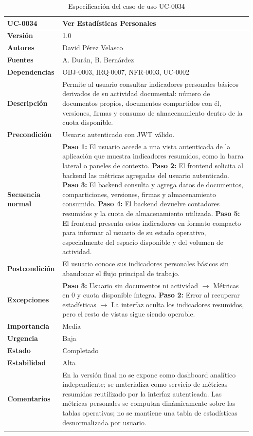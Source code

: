 \documentclass[11pt, a4paper]{article}
\begin{document}
\begin{longtable}{|p{4cm}|p{10cm}|}
\hline
\textbf{UC-0034} & Ver Estadísticas Personales \\
\hline
\textbf{Versión} & 1.0 \\
\hline
\textbf{Autores} & David Pérez Velasco \\
\hline
\textbf{Fuentes} & A. Durán, B. Bernárdez \\
\hline
\textbf{Dependencias} & OBJ-0003, IRQ-0007, NFR-0003, UC-0002 \\
\hline
\textbf{Descripción} & Permite al usuario consultar indicadores personales básicos derivados de su actividad documental: número de documentos propios, documentos compartidos con él, versiones, firmas y consumo de almacenamiento dentro de la cuota disponible. \\
\hline
\textbf{Precondición} & Usuario autenticado con JWT válido. \\
\hline
\textbf{Secuencia normal} &
\textbf{Paso 1:} El usuario accede a una vista autenticada de la aplicación que muestra indicadores resumidos, como la barra lateral o paneles de contexto.\newline
\textbf{Paso 2:} El frontend solicita al backend las métricas agregadas del usuario autenticado.\newline
\textbf{Paso 3:} El backend consulta y agrega datos de documentos, comparticiones, versiones, firmas y almacenamiento consumido.\newline
\textbf{Paso 4:} El backend devuelve contadores resumidos y la cuota de almacenamiento utilizada.\newline
\textbf{Paso 5:} El frontend presenta estos indicadores en formato compacto para informar al usuario de su estado operativo, especialmente del espacio disponible y del volumen de actividad.\\
\hline
\textbf{Postcondición} & El usuario conoce sus indicadores personales básicos sin abandonar el flujo principal de trabajo. \\
\hline
\textbf{Excepciones} &
\textbf{Paso 3:} Usuario sin documentos ni actividad $\rightarrow$ Métricas en 0 y cuota disponible íntegra.\newline
\textbf{Paso 2:} Error al recuperar estadísticas $\rightarrow$ La interfaz oculta los indicadores resumidos, pero el resto de vistas sigue siendo operable.\\
\hline
\textbf{Importancia} & Media \\
\hline
\textbf{Urgencia} & Baja \\
\hline
\textbf{Estado} & Completado \\
\hline
\textbf{Estabilidad} & Alta \\
\hline
\textbf{Comentarios} & En la versión final no se expone como dashboard analítico independiente; se materializa como servicio de métricas resumidas reutilizado por la interfaz autenticada. Las métricas personales se computan dinámicamente sobre las tablas operativas; no se mantiene una tabla de estadísticas desnormalizada por usuario. \\
\hline
\caption{Especificación del caso de uso UC-0034}
\end{longtable}
\end{document}
